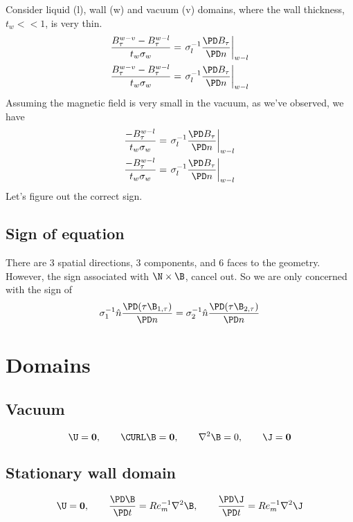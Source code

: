 \documentclass[11pt]{article}
\begin{document}
Consider liquid (l), wall (w) and vacuum (v) domains, where the wall thickness, $t_w<<1$, is very thin.
\begin{equation} \begin{aligned}
  \frac{B_{\tau}^{w-v}-B_{\tau}^{w-l}}{t_w \sigma_w}=\left. \sigma_l^{-1}\frac{\PD B_{\tau}}{\PD n} \right|_{w-l} \\
  \frac{B_{\tau}^{w-v}-B_{\tau}^{w-l}}{t_w \sigma_w}=\left. \sigma_l^{-1}\frac{\PD B_{\tau}}{\PD n} \right|_{w-l}
\end{aligned} \end{equation}
Assuming the magnetic field is very small in the vacuum, as we've observed, we have
\begin{equation} \begin{aligned}
  \frac{-B_{\tau}^{w-l}}{t_w \sigma_w}=\left. \sigma_l^{-1}\frac{\PD B_{\tau}}{\PD n} \right|_{w-l} \\
  \frac{-B_{\tau}^{w-l}}{t_w \sigma_w}=\left. \sigma_l^{-1}\frac{\PD B_{\tau}}{\PD n} \right|_{w-l}
\end{aligned} \end{equation}
Let's figure out the correct sign.
\subsection{Sign of equation}
There are 3 spatial directions, 3 components, and 6 faces to the geometry. However, the sign associated with $\mathbf{\N \times \B}$, cancel out. So we are only concerned with the sign of
\begin{equation}\begin{aligned}
\sigma_1^{-1} \hat{n} \frac{\PD (\tau \B_{1,\tau})}{\PD n} =
\sigma_2^{-1} \hat{n} \frac{\PD (\tau \B_{2,\tau})}{\PD n}
\end{aligned}\end{equation}


\section{Domains}

\subsection{Vacuum}
\begin{equation}
  \U = \mathbf{0}
  , \qquad
  \CURL \B = \mathbf{0}
  , \qquad
  \nabla^2 \B = 0
  , \qquad
  \J = \mathbf{0}
\end{equation}
\subsection{Stationary wall domain}
\begin{equation}
  \U = \mathbf{0}
  , \qquad
  \frac{\PD \B}{\PD t} = Re_m^{-1} \nabla^2 \B
  , \qquad
  \frac{\PD \J}{\PD t} = Re_m^{-1} \nabla^2 \J
\end{equation}
\end{document}
